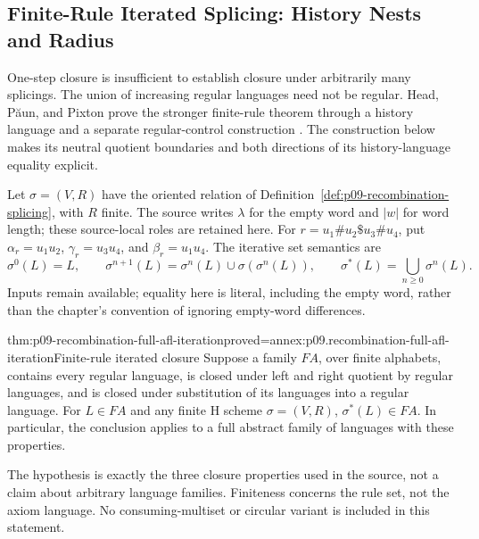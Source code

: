 \subsection{Finite-Rule Iterated Splicing: History Nests and Radius}
\label{sec:p09-recombination-iterated-closures}

One-step closure is insufficient to establish closure under arbitrarily many
splicings. The union of increasing regular languages need not be regular.
Head, P\u{a}un, and Pixton prove the stronger finite-rule theorem through
a history language and a separate regular-control construction
\cite[Lemma~3.14 and Remark~3.1, pp.~307--313]{HeadPaunPixton1997RecombinationIntake}.
The construction below makes its neutral quotient boundaries and both
directions of its history-language equality explicit.

Let \(\sigma=(V,R)\) have the oriented relation of
Definition~\ref{def:p09-recombination-splicing}, with \(R\) finite.
The source writes \(\lambda\) for the empty word and \(|w|\) for word length;
these source-local roles are retained here. For
\(r=u_1\#u_2\$u_3\#u_4\), put
\(\alpha_r=u_1u_2\), \(\gamma_r=u_3u_4\), and \(\beta_r=u_1u_4\).
The iterative set semantics are
\[
 \sigma^0(L)=L,\qquad
 \sigma^{n+1}(L)=\sigma^n(L)\cup\sigma(\sigma^n(L)),\qquad
 \sigma^*(L)=\bigcup_{n\geq0}\sigma^n(L).
\]
Inputs remain available; equality here is literal, including the empty word,
rather than the chapter's convention of ignoring empty-word differences.

\begin{hbtheorem}{thm:p09-recombination-full-afl-iteration}{proved=annex:p09.recombination-full-afl-iteration}{Finite-rule iterated closure}
Suppose a family \(FA\), over finite alphabets, contains every regular
language, is closed under left and right quotient by regular languages,
and is closed under substitution of its languages into a regular language.
For \(L\in FA\) and any finite H scheme \(\sigma=(V,R)\),
\(\sigma^*(L)\in FA\). In particular, the conclusion applies to a full
abstract family of languages with these properties.
\end{hbtheorem}

The hypothesis is exactly the three closure properties used in the source,
not a claim about arbitrary language families. Finiteness concerns the
rule set, not the axiom language. No consuming-multiset or circular variant
is included in this statement.

